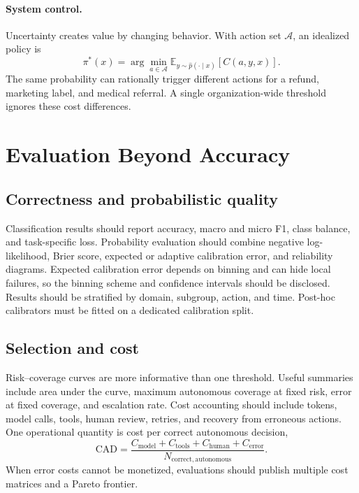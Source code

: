 \documentclass[11pt]{article}
\begin{document}
\paragraph{System control.} Uncertainty creates value by changing behavior. With action set $\mathcal{A}$, an idealized policy is
\begin{equation}
\pi^*(x)=\arg\min_{a\in\mathcal{A}}\mathbb{E}_{y\sim\hat p(\cdot\mid x)}[C(a,y,x)].
\end{equation}
The same probability can rationally trigger different actions for a refund, marketing label, and medical referral. A single organization-wide threshold ignores these cost differences.

\section{Evaluation Beyond Accuracy}

\subsection{Correctness and probabilistic quality}

Classification results should report accuracy, macro and micro F1, class balance, and task-specific loss. Probability evaluation should combine negative log-likelihood, Brier score, expected or adaptive calibration error, and reliability diagrams. Expected calibration error depends on binning and can hide local failures, so the binning scheme and confidence intervals should be disclosed. Results should be stratified by domain, subgroup, action, and time. Post-hoc calibrators must be fitted on a dedicated calibration split.

\subsection{Selection and cost}

Risk--coverage curves are more informative than one threshold. Useful summaries include area under the curve, maximum autonomous coverage at fixed risk, error at fixed coverage, and escalation rate. Cost accounting should include tokens, model calls, tools, human review, retries, and recovery from erroneous actions. One operational quantity is cost per correct autonomous decision,
\begin{equation}
\mathrm{CAD}=\frac{C_{\mathrm{model}}+C_{\mathrm{tools}}+C_{\mathrm{human}}+C_{\mathrm{error}}}{N_{\mathrm{correct,autonomous}}}.
\end{equation}
When error costs cannot be monetized, evaluations should publish multiple cost matrices and a Pareto frontier.
\end{document}
